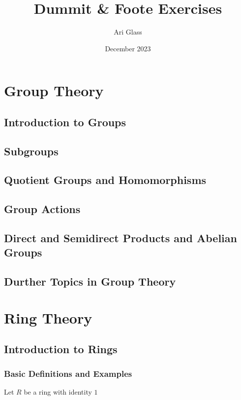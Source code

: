 \documentclass{report}
\title{Dummit \& Foote Exercises}
\author{Ari Glass}
\date{December 2023}
\begin{document}
\maketitle
\tableofcontents

\part{Group Theory}
\chapter{Introduction to Groups}
\chapter{Subgroups}
\chapter{Quotient Groups and Homomorphisms}
\chapter{Group Actions}
\chapter{Direct and Semidirect Products and Abelian Groups}
\chapter{Durther Topics in Group Theory}


\part{Ring Theory}

\chapter{Introduction to Rings}

\section{Basic Definitions and Examples}
Let $R$ be a ring with identity $1$
\end{document}
